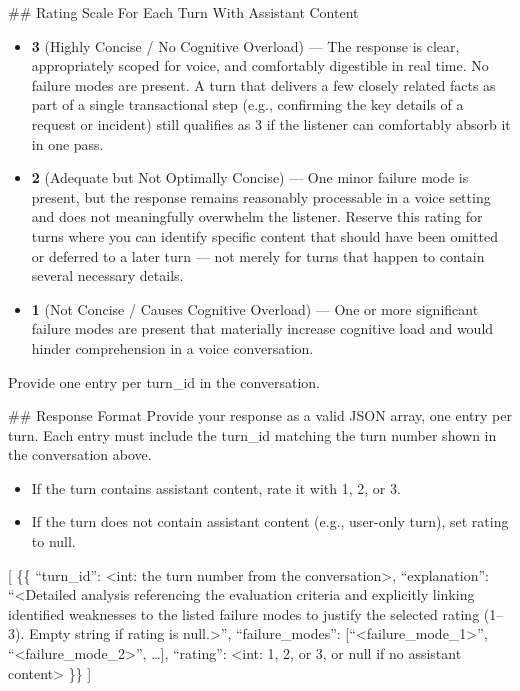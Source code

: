 \begin{tcolorbox}[promptbox, title={\small Conciseness Prompt}]
      \#\# Rating Scale For Each Turn With Assistant Content
      \begin{itemize}
        \item \textbf{3} (Highly Concise / No Cognitive Overload) --- The response is clear, appropriately scoped for voice, and comfortably digestible in real time. No failure modes are present. A turn that delivers a few closely related facts as part of a single transactional step (e.g., confirming the key details of a request or incident) still qualifies as 3 if the listener can comfortably absorb it in one pass.
        \item \textbf{2} (Adequate but Not Optimally Concise) --- One minor failure mode is present, but the response remains reasonably processable in a voice setting and does not meaningfully overwhelm the listener. Reserve this rating for turns where you can identify specific content that should have been omitted or deferred to a later turn --- not merely for turns that happen to contain several necessary details.
        \item \textbf{1} (Not Concise / Causes Cognitive Overload) --- One or more significant failure modes are present that materially increase cognitive load and would hinder comprehension in a voice conversation.
      \end{itemize}

      Provide one entry per turn\_id in the conversation.\newline

      \#\# Response Format\newline
      Provide your response as a valid JSON array, one entry per turn. Each entry must include the turn\_id matching the turn number shown in the conversation above.
      \begin{itemize}
        \item If the turn contains assistant content, rate it with 1, 2, or 3.
        \item If the turn does not contain assistant content (e.g., user-only turn), set rating to null.
      \end{itemize}
      [\newline
        \{\{\newline
          ``turn\_id'': \textless{}int: the turn number from the conversation\textgreater{},\newline
          ``explanation'': ``\textless{}Detailed analysis referencing the evaluation criteria and explicitly linking identified weaknesses to the listed failure modes to justify the selected rating (1--3). Empty string if rating is null.\textgreater{}'',\newline
          ``failure\_modes'': [``\textless{}failure\_mode\_1\textgreater{}'', ``\textless{}failure\_mode\_2\textgreater{}'', \ldots{}],\newline
          ``rating'': \textless{}int: 1, 2, or 3, or null if no assistant content\textgreater{}\newline
        \}\}\newline
      ]\newline


\end{tcolorbox}
